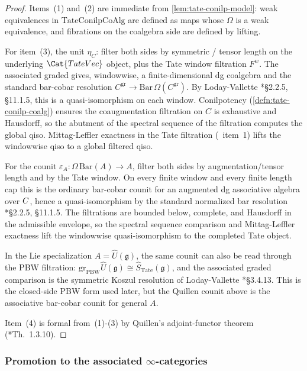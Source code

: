 \begin{proof}
  Items~(1) and~(2) are immediate from
  \ref{lem:tate-conilp-model}: weak equivalences in
  $\mathrm{TateConilpCoAlg}$ are defined as maps whose $\Omega$
  is a weak equivalence, and fibrations on the coalgebra side are
  defined by lifting.

  For item~(3), the unit $\eta_C$: filter both sides by symmetric
  / tensor length on the underlying $\Cat{TateVec}$ object, plus
  the Tate window filtration $F^w$. The associated graded gives,
  windowwise, a finite-dimensional dg coalgebra and the standard
  bar-cobar resolution
  $C^{\mathrm{gr}}\to\mathrm{Bar}\,\Omega(C^{\mathrm{gr}})$. By
  Loday-Vallette \cite{loday-vallette}*{\S 2.2.5, \S 11.1.5}, this
  is a quasi-isomorphism on each window. Conilpotency
  (\ref{defn:tate-conilp-coalg}) ensures the coaugmentation
  filtration on $C$ is exhaustive and Hausdorff, so the abutment
  of the spectral sequence of the filtration computes the global
  qiso. Mittag-Leffler exactness in the Tate filtration
  (\alpharef\ item~1) lifts the windowwise qiso to a global
  filtered qiso.

  For the counit
  \(\varepsilon_A\colon\Omega\,\mathrm{Bar}(A)\to A\), filter both
  sides by augmentation/tensor length and by the Tate window.  On every
  finite window and every finite length cap this is the ordinary
  bar-cobar counit for an augmented dg associative algebra over
  \(C\), hence a quasi-isomorphism by the standard normalized bar
  resolution \cite{loday-vallette}*{\S 2.2.5, \S 11.1.5}.  The
  filtrations are bounded below, complete, and Hausdorff in the
  admissible envelope, so the spectral sequence comparison and
  Mittag-Leffler exactness lift the windowwise quasi-isomorphism to the
  completed Tate object.

  In the Lie specialization \(A=\widehat U(\mathfrak g)\), the same
  counit can also be read through the PBW filtration:
  \(\mathrm{gr}_{\mathrm{PBW}}\widehat U(\mathfrak g)\cong
  \widehat S_{\mathrm{Tate}}(\mathfrak g)\), and the associated graded
  comparison is the symmetric Koszul resolution of
  Loday-Vallette \cite{loday-vallette}*{\S 3.4.13}.  This is the
  closed-side PBW form used later, but the Quillen counit above is the
  associative bar-cobar counit for general \(A\).

  Item~(4) is formal from~(1)-(3) by Quillen's adjoint-functor
  theorem (\cite{hovey}*{Th.~1.3.10}).
\end{proof}

\subsubsection[Promotion to the associated infinity-categories]{Promotion to the associated $\infty$-categories}

